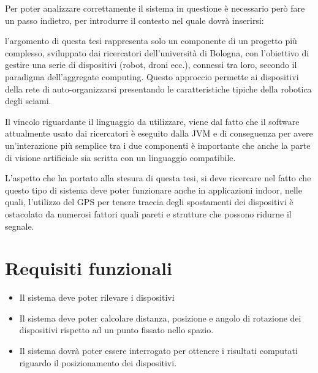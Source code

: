 \documentclass[12pt,a4paper,openright,twoside]{book}
\begin{document}
Per poter analizzare correttamente il sistema in questione è necessario però fare un passo indietro, per introdurre il contesto nel quale dovrà inserirsi:
\begin{adjustwidth}{1cm}{0cm}
l'argomento di questa tesi rappresenta solo un componente di un progetto più complesso, sviluppato dai ricercatori dell'università di Bologna, con l'obiettivo di gestire una serie di dispositivi (robot, droni ecc.), connessi tra loro, secondo il paradigma dell'aggregate computing.
Questo approccio permette ai dispositivi della rete di auto-organizzarsi presentando le caratteristiche tipiche della robotica degli sciami.

Il vincolo riguardante il linguaggio da utilizzare, viene dal fatto che il software attualmente usato dai ricercatori è eseguito dalla JVM e di conseguenza per avere un'interazione più semplice tra i due componenti è importante che anche la parte di visione artificiale sia scritta con un linguaggio compatibile.
\end{adjustwidth}

L'aspetto che ha portato alla stesura di questa tesi, si deve ricercare nel fatto che questo tipo di sistema deve poter funzionare anche in applicazioni indoor, nelle quali, l'utilizzo del GPS per tenere traccia degli spostamenti dei dispositivi è ostacolato da numerosi fattori quali pareti e strutture che possono ridurne il segnale.

\section{Requisiti funzionali} \label{sec:requisiti_funzionali}
\begin{itemize}
	\item Il sistema deve poter rilevare i dispositivi
	\item Il sistema deve poter calcolare distanza, posizione e angolo di rotazione dei dispositivi rispetto ad un punto fissato nello spazio.
	\item Il sistema dovrà poter essere interrogato per ottenere i risultati computati riguardo il posizionamento dei dispositivi.
\end{itemize}
\end{document}
